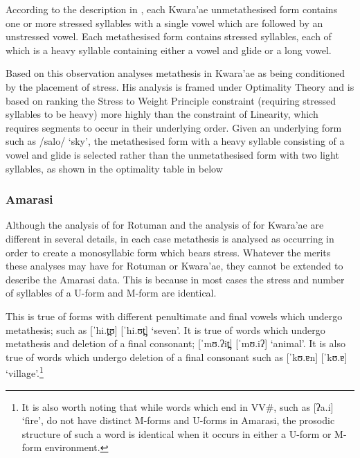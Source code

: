 According to the description in \citet{he04},
each Kwara'ae unmetathesised form
contains one or more stressed syllables with a single vowel
which are followed by an unstressed vowel.
Each metathesised form contains stressed syllables,
each of which is a heavy syllable containing either
a vowel and glide or a long vowel.

Based on this observation \cite{he04} analyses metathesis in Kwara'ae
as being conditioned by the placement of stress.
His analysis is framed under Optimality Theory
and is based on ranking the Stress to Weight Principle constraint (requiring
stressed syllables to be heavy) more highly than the constraint of Linearity,
which requires segments to occur in their underlying order.
Given an underlying form such as /salo/ `sky',
the metathesised form with a heavy syllable consisting of a vowel and glide
is selected rather than the unmetathesised form with two light syllables,
as shown in the optimality table in  below

\begin{exe}
		\label{KwMetOT}
\end{exe}

\subsubsection{Amarasi}
Although the analysis of \cite{mcc00} for Rotuman
and the analysis of \cite{he04} for Kwara'ae
are different in several details,
in each case metathesis is analysed as occurring in
order to create a monosyllabic form which bears stress.
Whatever the merits these analyses may have for Rotuman or Kwara'ae,
they cannot be extended to describe the Amarasi data.
This is because in most cases the stress
and number of syllables of a U-form and M-form are identical.

This is true of forms with different penultimate and final vowels
which undergo metathesis; such as  [ˈhi.t̪ʊ] {\ra}  [ˈhi.ʊt̪] `seven'.
It is true of words which undergo metathesis and deletion of a final consonant;
 [ˈmʊ.ʔit̪] {\ra}  [ˈmʊ.iʔ] `animal'.
It is also true of words which undergo deletion of a final consonant
such as  [ˈkʊ.ɐn] {\ra}  [ˈkʊ.ɐ] `village'.\footnote{
		It is also worth noting that while words which end in VV{\#},
		such as  [ʔa.i] `fire',
		do not have distinct M-forms and U-forms in Amarasi,
		the prosodic structure of such a word is identical
		when it occurs in either a U-form or M-form environment.}

